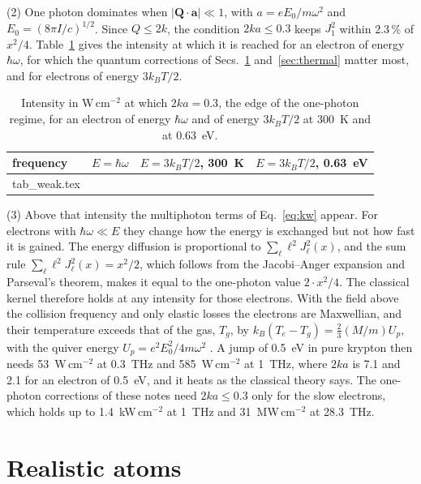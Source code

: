 \documentclass[11pt]{article}
\makeatletter
\numberwithin{equation}{section}
\newcommand{\tabinput}[1]{\@@input #1 }
\newcommand{\Qv}{\mathbf Q}
\newcommand{\av}{\mathbf a}
\newcommand{\kB}{k_B}
\makeatother
\begin{document}
{\noindent}(2) One photon dominates when $|\Qv\cdot\av|\ll1$, with
$a=eE_0/m\omega^2$ and $E_0=(8\pi I/c)^{1/2}$. Since $Q\le2k$, the condition
$2ka\le0.3$ keeps $J_1^2$ within 2.3\,\% of $x^2/4$. Table~\ref{tab:weak} gives
the intensity at which it is reached for an electron of energy $\hbar\omega$,
for which the quantum corrections of Secs.~\ref{sec:models}
and~\ref{sec:thermal} matter most, and for electrons of energy $3\kB T/2$.

\begin{table}[ht]
\caption{Intensity in W\,cm$^{-2}$ at which $2ka=0.3$, the edge of the
one-photon regime, for an electron of energy $\hbar\omega$ and of energy
$3\kB T/2$ at 300~K and at 0.63~eV.}
\label{tab:weak}
\begin{center}
\begin{tabular}{lccc}
\toprule
frequency & $E=\hbar\omega$ & $E=3\kB T/2$, 300~K & $E=3\kB T/2$, 0.63~eV\\
\midrule
\tabinput{tab_weak.tex}
\bottomrule
\end{tabular}
\end{center}
\end{table}

{\noindent}(3) Above that intensity the multiphoton terms of Eq.~\eqref{eq:kw}
appear. For electrons with $\hbar\omega\ll E$ they change how the energy is
exchanged but not how fast it is gained. The energy diffusion is proportional
to $\sum_\ell\ell^2J_\ell^2(x)$, and the sum rule
$\sum_\ell\ell^2J_\ell^2(x)=x^2/2$, which follows from the Jacobi--Anger
expansion and Parseval's theorem, makes it equal to
the one-photon value $2\cdot x^2/4$. The classical kernel therefore holds at any
intensity for those electrons. With the field above the collision frequency
and only elastic losses the electrons are Maxwellian, and their temperature
exceeds that of the gas, $T_g$, by $\kB(T_e-T_g)=\frac23(M/m)U_p$, with the
quiver energy $U_p=e^2E_0^2/4m\omega^2$ \cite{Margenau1946}. A jump of 0.5~eV in
pure krypton then needs 53~W\,cm$^{-2}$ at 0.3~THz and 585~W\,cm$^{-2}$ at 1~THz, where
$2ka$ is 7.1 and 2.1 for an electron of 0.5~eV, and it heats as the classical
theory says. The one-photon corrections of these notes need $2ka\le0.3$ only
for the slow electrons, which holds up to 1.4~kW\,cm$^{-2}$ at 1~THz and
31~MW\,cm$^{-2}$ at 28.3~THz.

\section{Realistic atoms}
\label{sec:models}
\end{document}
